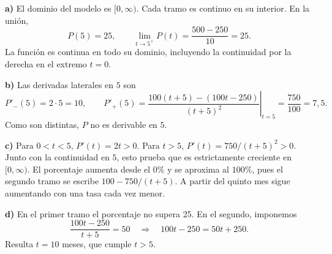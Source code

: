 \textbf{a)} El dominio del modelo es $[0,\infty)$. Cada tramo es continuo en su interior. En la unión,
\[
 P(5)=25,\qquad\lim_{t\to5^+}P(t)=\frac{500-250}{10}=25.
\]
La función es continua en todo su dominio, incluyendo la continuidad por la derecha en el extremo $t=0$.

\textbf{b)} Las derivadas laterales en $5$ son
\[
 P'_-(5)=2\cdot5=10,\qquad
 P'_+(5)=\left.\frac{100(t+5)-(100t-250)}{(t+5)^2}\right|_{t=5}
 =\frac{750}{100}=7{,}5.
\]
Como son distintas, $P$ no es derivable en $5$.

\textbf{c)} Para $0<t<5$, $P'(t)=2t>0$. Para $t>5$, $P'(t)=750/(t+5)^2>0$. Junto con la continuidad en $5$, esto prueba que es estrictamente creciente en $[0,\infty)$. El porcentaje aumenta desde el $0\%$ y se aproxima al $100\%$, pues el segundo tramo se escribe $100-750/(t+5)$. A partir del quinto mes sigue aumentando con una tasa cada vez menor.

\textbf{d)} En el primer tramo el porcentaje no supera 25. En el segundo, imponemos
\[
 \frac{100t-250}{t+5}=50
 \quad\Longrightarrow\quad100t-250=50t+250.
\]
Resulta $t=\boxed{10}$ meses, que cumple $t>5$.
